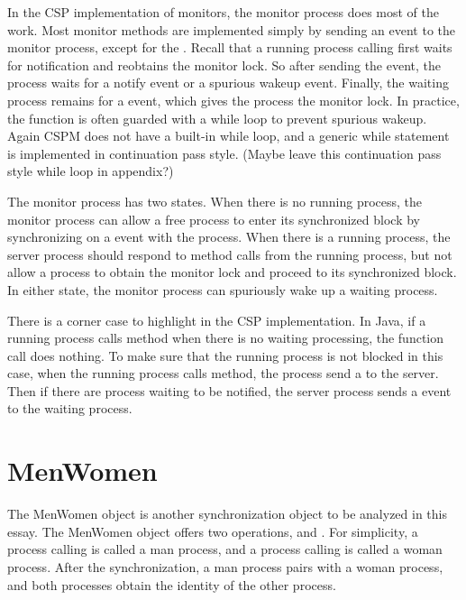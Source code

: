 \documentclass{article}
\begin{document}
In the CSP implementation of monitors, the monitor process does most of the work. Most monitor methods are implemented simply by sending an event to the monitor process, except for the . Recall that a running process calling  first waits for notification and reobtains the monitor lock. So after sending the  event, the process waits for a notify event or a spurious wakeup event. Finally, the waiting process remains for a  event, which gives the process the monitor lock. In practice, the  function is often guarded with a while loop to prevent spurious wakeup. Again CSPM does not have a built-in while loop, and a generic while statement is implemented in continuation pass style. (Maybe leave this continuation pass style while loop in appendix?)

The monitor process has two states. When there is no running process, the monitor process can allow a free process to enter its synchronized block by synchronizing on a  event with the process. When there is a running process, the server process should respond to method calls from the running process, but not allow a process to obtain the monitor lock and proceed to its synchronized block. In either state, the monitor process can spuriously wake up a waiting process.

There is a corner case to highlight in the CSP implementation. In Java, if a running process calls  method when there is no waiting processing, the function call does nothing. To make sure that the running process is not blocked in this case, when the running process calls  method, the process send a  to the server. Then if there are process waiting to be notified, the server process sends a  event to the waiting process.

\section{MenWomen}
The MenWomen object is another synchronization object to be analyzed in this essay. The MenWomen object offers two operations,  and . For simplicity, a process calling  is called a man process, and a process calling  is called a woman process. After the synchronization, a man process pairs with a woman process, and both processes obtain the identity of the other process. 
\end{document}
